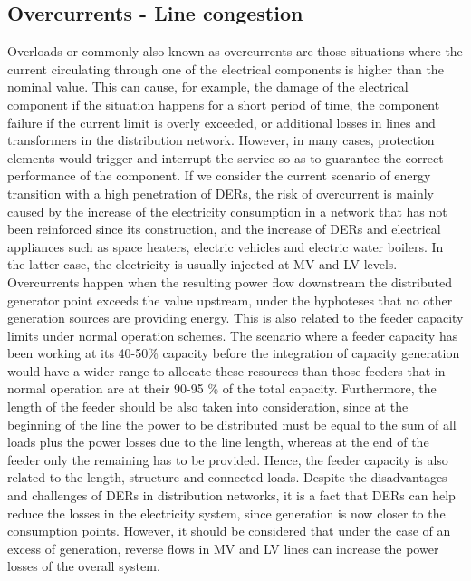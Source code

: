\subsection{Overcurrents - Line congestion}
Overloads or commonly also known as overcurrents are those situations where the current circulating through one of the electrical components is higher than the nominal value. This can cause, for example, the damage of the electrical component if the situation happens for a short period of time, the component failure if the current limit is overly exceeded, or additional losses in lines and transformers in the distribution network. However, in many cases, protection elements would trigger and interrupt the service so as to guarantee the correct performance of the component. 
If we consider the current scenario of energy transition with a high penetration of DERs, the risk of overcurrent is mainly caused by the increase of the electricity consumption in a network that has not been reinforced since its construction, and the increase of DERs and electrical appliances such as space heaters, electric vehicles and electric water boilers. In the latter case, the electricity is usually injected at MV and LV levels. Overcurrents happen when the resulting power flow downstream the distributed generator point exceeds the value upstream, under the hyphoteses that no other generation sources are providing energy. This is also related to the feeder capacity limits under normal operation schemes. The scenario where a feeder capacity has been working at its 40-50\% capacity before the integration of capacity generation would have a wider range to allocate these resources than those feeders that in normal operation are at their 90-95 \% of the total capacity. Furthermore, the length of the feeder should be also taken into consideration, since at the beginning of the line the power to be distributed must be equal to the sum of all loads plus the power losses due to the line length, whereas at the end of the feeder only the remaining has to be provided. Hence, the feeder capacity is also related to the length, structure and connected loads. 
Despite the disadvantages and challenges of DERs in distribution networks, it is a fact that DERs can help reduce the losses in the electricity system, since generation is now closer to the consumption points. However, it should be considered that under the case of an excess of generation, reverse flows in MV and LV lines can increase the power losses of the overall system. 

